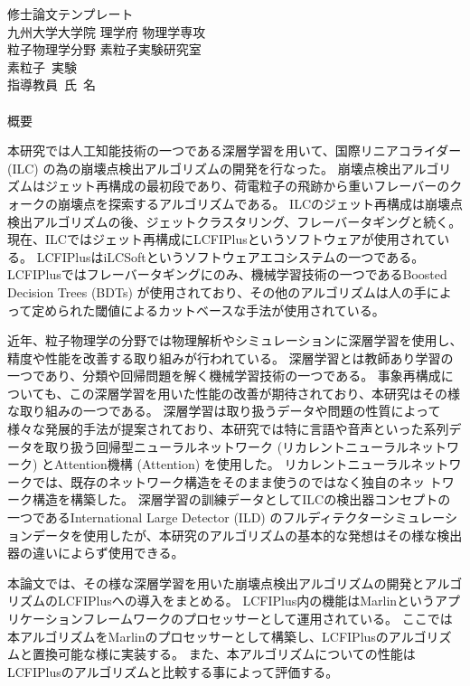 
\begin{center}
\thispagestyle{empty}
{\Large 修士論文テンプレート}\\
九州大学大学院 理学府 物理学専攻 \\ 粒子物理学分野 素粒子実験研究室 \\
素粒子\ 実験 \\[1ex] 指導教員\ 氏\ 名\\ 　 \\
\fi
{\huge 概要}\\
\end{center}

本研究では人工知能技術の一つである深層学習を用いて、国際リニアコライダー (ILC) の為の崩壊点検出アルゴリズムの開発を行なった。
崩壊点検出アルゴリズムはジェット再構成の最初段であり、荷電粒子の飛跡から重いフレーバーのクォークの崩壊点を探索するアルゴリズムである。
ILCのジェット再構成は崩壊点検出アルゴリズムの後、ジェットクラスタリング、フレーバータギングと続く。
現在、ILCではジェット再構成にLCFIPlus\cite{LCFIPlusPaper}というソフトウェアが使用されている。
LCFIPlusはiLCSoftというソフトウェアエコシステムの一つである。
LCFIPlusではフレーバータギングにのみ、機械学習技術の一つであるBoosted Decision Trees (BDTs) が使用されており、その他のアルゴリズムは人の手によって定められた閾値によるカットベースな手法が使用されている。

近年、粒子物理学の分野では物理解析やシミュレーションに深層学習を使用し、精度や性能を改善する取り組みが行われている。
深層学習とは教師あり学習の一つであり、分類や回帰問題を解く機械学習技術の一つである。
事象再構成についても、この深層学習を用いた性能の改善が期待されており、本研究はその様な取り組みの一つである。
深層学習は取り扱うデータや問題の性質によって様々な発展的手法が提案されており、本研究では特に言語や音声といった系列データを取り扱う回帰型ニューラルネットワーク (リカレントニューラルネットワーク) とAttention機構 (Attention) を使用した。
リカレントニューラルネットワークでは、既存のネットワーク構造をそのまま使うのではなく独自のネッ トワーク構造を構築した。
深層学習の訓練データとしてILCの検出器コンセプトの一つであるInternational Large Detector (ILD) のフルディテクターシミュレーションデータを使用したが、本研究のアルゴリズムの基本的な発想はその様な検出器の違いによらず使用できる。

本論文では、その様な深層学習を用いた崩壊点検出アルゴリズムの開発とアルゴリズムのLCFIPlusへの導入をまとめる。
LCFIPlus内の機能はMarlinというアプリケーションフレームワークのプロセッサーとして運用されている。
ここでは本アルゴリズムをMarlinのプロセッサーとして構築し、LCFIPlusのアルゴリズムと置換可能な様に実装する。
また、本アルゴリズムについての性能はLCFIPlusのアルゴリズムと比較する事によって評価する。
